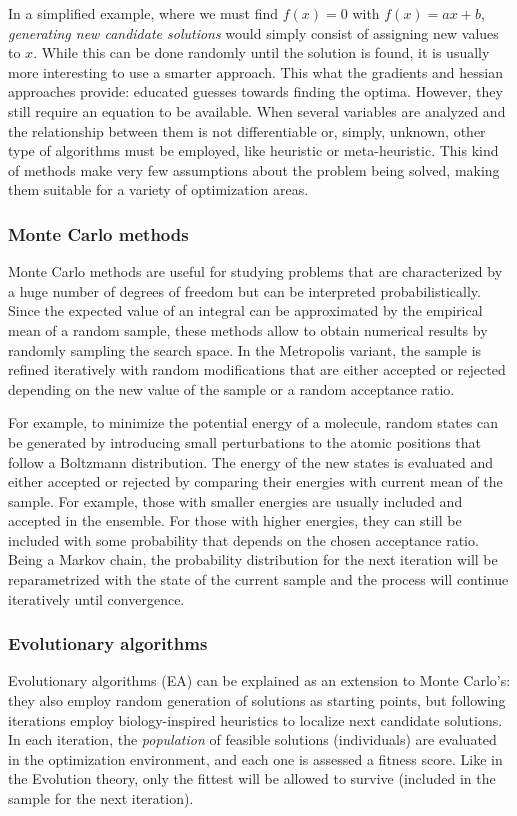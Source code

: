 In a simplified example, where we must find $f(x) = 0$ with $f(x) = ax + b$, \textit{generating new candidate solutions} would simply consist of assigning new values to $x$. While this can be done randomly until the solution is found, it is usually more interesting to use a smarter approach. This what the gradients and hessian approaches provide: educated guesses towards finding the optima. However, they still require an equation to be available. When several variables are analyzed and the relationship between them is not differentiable or, simply, unknown, other type of algorithms must be employed, like heuristic or meta-heuristic. This kind of methods make very few assumptions about the problem being solved, making them suitable for a variety of optimization areas.

\subsubsection{Monte Carlo methods}

Monte Carlo methods are useful for studying problems that are characterized by a huge number of degrees of freedom but can be interpreted probabilistically. Since the expected value of an integral can be approximated by the empirical mean of a random sample, these methods allow to obtain numerical results by randomly sampling the search space. In the Metropolis variant, the sample is refined iteratively with random modifications that are either accepted or rejected depending on the new value of the sample or a random acceptance ratio.

For example, to minimize the potential energy of a molecule, random states can be generated by introducing small perturbations to the atomic positions that follow a Boltzmann distribution. The energy of the new states is evaluated and either accepted or rejected by comparing their energies with current mean of the sample. For example, those with smaller energies are usually included and accepted in the ensemble. For those with higher energies, they can still be included with some probability that depends on the chosen acceptance ratio. Being a Markov chain, the probability distribution for the next iteration will be reparametrized with the state of the current sample and the process will continue iteratively until convergence.

\subsubsection{Evolutionary algorithms}
Evolutionary algorithms (EA) can be explained as an extension to Monte Carlo’s: they also employ random generation of solutions as starting points, but following iterations employ biology-inspired heuristics to localize next candidate solutions. In each iteration, the \textit{population} of feasible solutions (individuals) are evaluated in the optimization environment, and each one is assessed a fitness score. Like in the Evolution theory, only the fittest will be allowed to survive (included in the sample for the next iteration).

